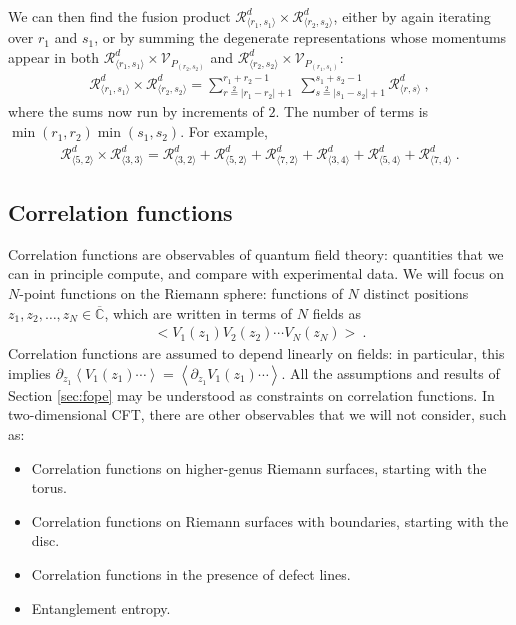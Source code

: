 \documentclass[12pt, a4paper]{article}
\theoremstyle{break}
\begin{document}
We can then find the fusion product $\mathcal{R}^d_{\langle r_1,s_1\rangle}\times \mathcal{R}^d_{\langle r_2,s_2\rangle}$, either by again iterating over $r_1$ and $s_1$, or by summing the degenerate representations whose momentums appear in both  $\mathcal{R}^d_{\langle r_1,s_1\rangle}\times \mathcal{V}_{P_{(r_2,s_2)}}$ and $\mathcal{R}^d_{\langle r_2,s_2\rangle}\times \mathcal{V}_{P_{(r_1,s_1)}}$:
\begin{align}
  \boxed{\mathcal{R}^d_{\langle r_1,s_1 \rangle} \times \mathcal{R}^d_{\langle r_2,s_2 \rangle} = \sum_{r\overset{2}{=}|r_1-r_2|+1}^{r_1+r_2-1}\ \sum_{s\overset{2}{=}|s_1-s_2|+1}^{s_1+s_2-1} \mathcal{R}^d_{\langle r,s \rangle}}\ ,
  \label{rrsr}
\end{align}
where the sums now run by increments of $2$. The number of terms is $\min(r_1,r_2)\min(s_1,s_2)$. For example,
\begin{align}
 \mathcal{R}^d_{\langle 5,2\rangle}\times \mathcal{R}^d_{\langle 3,3\rangle} = \mathcal{R}^d_{\langle 3,2\rangle} + \mathcal{R}^d_{\langle 5, 2\rangle} + \mathcal{R}^d_{\langle 7,2\rangle} +\mathcal{R}^d_{\langle 3,4\rangle}+\mathcal{R}^d_{\langle 5,4\rangle} + \mathcal{R}^d_{\langle 7,4\rangle} \ .
\end{align}



\subsection{Correlation functions}\label{sec:cor}

Correlation functions are observables of quantum field theory: quantities that we can in principle compute, and compare with experimental data. We will focus on $N$-point functions on the Riemann sphere: functions of $N$ distinct positions $z_1,z_2,\dots, z_N\in \overline{\mathbb{C}}$, which are written in terms of $N$ fields as 
\begin{align}
 \Big< V_1(z_1) V_2(z_2) \cdots V_N(z_N)\Big>\ . 
\end{align}
Correlation functions are assumed to depend linearly on fields: in particular, this implies $\partial_{z_1}\left<  V_1(z_1) \cdots \right> = \left< \partial_{z_1} V_1(z_1) \cdots \right>$.
All the assumptions and results of Section \ref{sec:fope} may be understood as constraints on correlation functions. 
In two-dimensional CFT, there are other observables that we will not consider, such as: 
\begin{itemize}
 \item Correlation functions on higher-genus Riemann surfaces, starting with the torus. 
 \item Correlation functions on Riemann surfaces with boundaries, starting with the disc. 
 \item Correlation functions in the presence of defect lines. 
 \item Entanglement entropy. 
\end{itemize}
\end{document}
